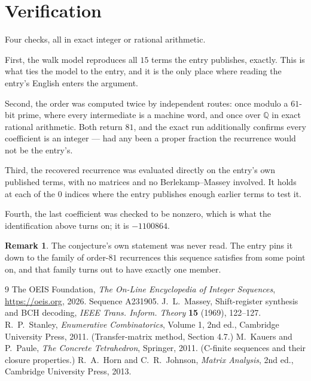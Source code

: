 \documentclass[11pt,a4paper]{article}
\theoremstyle{plain}
\theoremstyle{definition}
\newtheorem{remark}[theorem]{Remark}
\begin{document}
\section{Verification}

Four checks, all in exact integer or rational arithmetic.

First, the walk model reproduces all $15$ terms the entry publishes, exactly. This is
what ties the model to the entry, and it is the only place where reading the entry's English
enters the argument.

Second, the order was computed twice by independent routes: once modulo a $61$-bit prime, where
every intermediate is a machine word, and once over $\mathbb{Q}$ in exact rational arithmetic.
Both return $81$, and the exact run additionally confirms every coefficient is an integer
--- had any been a proper fraction the recurrence would not be the entry's.

Third, the recovered recurrence was evaluated directly on the entry's own published terms, with
no matrices and no Berlekamp--Massey involved. It holds at each of the $0$ indices where
the entry publishes enough earlier terms to test it.

Fourth, the last coefficient was checked to be nonzero, which is what the identification above
turns on; it is $-1100864$.

\begin{remark}
The conjecture's own statement was never read. The entry pins it down to the family of
order-$81$ recurrences this sequence satisfies from some point on, and that family turns
out to have exactly one member.
\end{remark}

\begin{thebibliography}{9}
 The OEIS Foundation, \emph{The On-Line Encyclopedia of Integer
Sequences}, \url{https://oeis.org}, 2026. Sequence A231905.
 J.~L.~Massey, Shift-register synthesis and BCH decoding, \emph{IEEE
Trans. Inform. Theory} \textbf{15} (1969), 122--127.
 R.~P.~Stanley, \emph{Enumerative Combinatorics}, Volume 1, 2nd ed.,
Cambridge University Press, 2011. (Transfer-matrix method, Section 4.7.)
 M.~Kauers and P.~Paule, \emph{The Concrete Tetrahedron}, Springer, 2011.
(C-finite sequences and their closure properties.)
 R.~A.~Horn and C.~R.~Johnson, \emph{Matrix Analysis}, 2nd ed., Cambridge
University Press, 2013.
\end{thebibliography}
\end{document}
